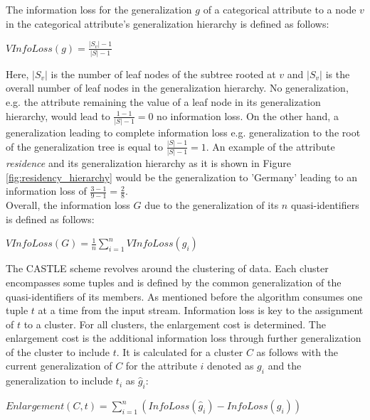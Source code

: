 The information loss for the generalization $g$ of a categorical attribute to a node $v$ in the categorical attribute's generalization hierarchy is defined as follows: 

\begin{center}
    $VInfoLoss(g) = \frac{|S_v| - 1}{|S| - 1}$
\end{center}

Here, $|S_v|$ is the number of leaf nodes of the subtree rooted at $v$ and $|S_v|$ is the overall number of leaf nodes in the generalization hierarchy. No generalization, e.g. the attribute remaining the value of a leaf node in its generalization hierarchy, would lead to $\frac{1-1}{|S| - 1} = 0$ no information loss. On the other hand, a generalization leading to complete information loss e.g. generalization to the root of the generalization tree is equal to $\frac{|S| - 1}{|S| - 1} = 1$. An example of the attribute \textit{residence} and its generalization hierarchy as it is shown in Figure \ref{fig:residency_hierarchy} would be the generalization to 'Germany' leading to an information loss of $\frac{3-1}{9-1} = \frac{2}{8}$. \\
Overall, the information loss $G$ due to the generalization of its $n$ quasi-identifiers is defined as follows: 

\begin{center}
    $VInfoLoss(G) = \frac{1}{n}\sum_{i=1}^{n}VInfoLoss(g_i)$
\end{center}

The CASTLE scheme revolves around the clustering of data. Each cluster encompasses some tuples and is defined by the common generalization of the quasi-identifiers of its members. As mentioned before the algorithm consumes one tuple $t$ at a time from the input stream. Information loss is key to the assignment of $t$ to a cluster. For all clusters, the enlargement cost is determined. The enlargement cost is the additional information loss through further generalization of the cluster to include $t$. It is calculated for a cluster $C$ as follows with the current generalization of $C$ for the attribute $i$ denoted as $g_i$ and the generalization to include $t_i$ as $\hat{g}_i$: 

\begin{center}
    $Enlargement(C,t) = \sum_{i=1}^{n}(InfoLoss(\hat{g}_i) - InfoLoss(g_i))$
\end{center}

